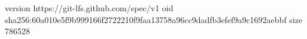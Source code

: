 version https://git-lfs.github.com/spec/v1
oid sha256:60a010e5f9b999166f2722210f9faa13758a96cc9dadfb3efef9a9c1692aebbf
size 786528
